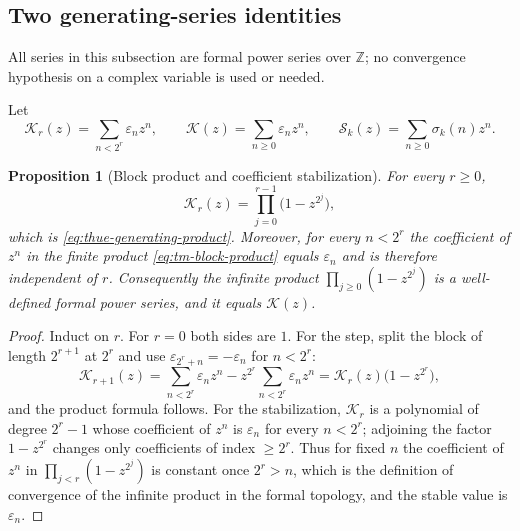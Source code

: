 \documentclass[11pt,oneside]{article}
\newtheorem{proposition}[theorem]{Proposition}
\theoremstyle{definition}
\theoremstyle{remark}
\newcommand{\Z}{\mathbb Z}
\begin{document}
\subsection{Two generating-series identities}
\label{tm:sub-generating}

All series in this subsection are formal power series over $\Z$; no convergence hypothesis
on a complex variable is used or needed.

Let
\begin{equation}
 \mathcal K_r(z)=\sum_{n<2^r}\varepsilon_nz^n,
 \qquad
 \mathcal K(z)=\sum_{n\ge0}\varepsilon_nz^n,
 \qquad
 \mathcal S_k(z)=\sum_{n\ge0}\sigma_k(n)z^n.               \label{eq:tm-series-def}
\end{equation}

\begin{proposition}[Block product and coefficient stabilization]
\label{thm:tm-block-product}
For every $r\ge0$,
\begin{equation}
 \mathcal K_r(z)=\prod_{j=0}^{r-1}\bigl(1-z^{2^j}\bigr),   \label{eq:tm-block-product}
\end{equation}
which is \eqref{eq:thue-generating-product}.  Moreover, for every $n<2^r$ the coefficient
of $z^n$ in the finite product \eqref{eq:tm-block-product} equals $\varepsilon_n$ and is
therefore independent of $r$.  Consequently the infinite product
$\prod_{j\ge0}(1-z^{2^j})$ is a well-defined formal power series, and it equals
$\mathcal K(z)$.
\end{proposition}

\begin{proof}
Induct on $r$.  For $r=0$ both sides are $1$.  For the step, split the block of length
$2^{r+1}$ at $2^r$ and use $\varepsilon_{2^r+n}=-\varepsilon_n$ for $n<2^r$:
\begin{equation*}
 \mathcal K_{r+1}(z)
 =\sum_{n<2^r}\varepsilon_nz^n-z^{2^r}\sum_{n<2^r}\varepsilon_nz^n
 =\mathcal K_r(z)\bigl(1-z^{2^r}\bigr),
\end{equation*}
and the product formula follows.  For the stabilization, $\mathcal K_r$ is a polynomial of
degree $2^r-1$ whose coefficient of $z^n$ is $\varepsilon_n$ for every $n<2^r$; adjoining
the factor $1-z^{2^r}$ changes only coefficients of index $\ge2^r$.  Thus for fixed $n$ the
coefficient of $z^n$ in $\prod_{j<r}(1-z^{2^j})$ is constant once $2^r>n$, which is the
definition of convergence of the infinite product in the formal topology, and the stable
value is $\varepsilon_n$.
\end{proof}
\end{document}
